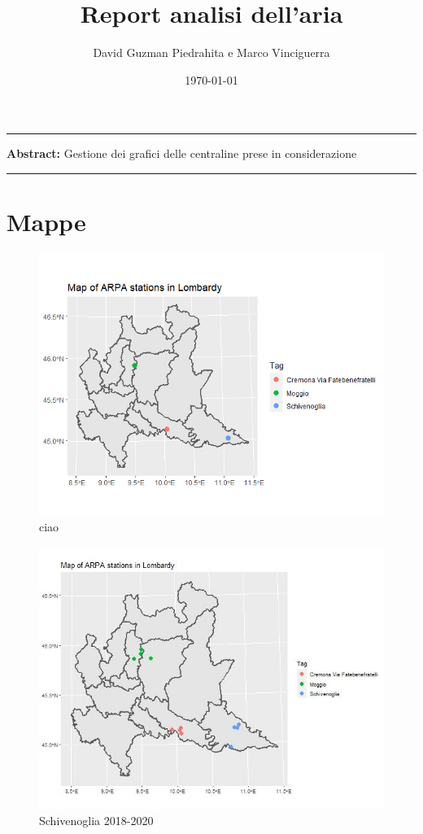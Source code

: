 \documentclass{article}
\title{Report analisi dell'aria}
\author{David Guzman Piedrahita e Marco Vinciguerra}
\date{\today}
\begin{document}
\maketitle

\par\noindent\rule{\textwidth}{0.4pt}
\textbf{Abstract:} Gestione dei grafici delle centraline prese in considerazione
\par\noindent\rule{\textwidth}{0.4pt}
\section{Mappe}
\begin{figure}[H]
  \centering
  \includegraphics[scale = 0.7]{Picture/AQStationsOfInterest.jpeg}
  \caption{ciao}
\end{figure}
\begin{figure}[H]
  \centering
  \includegraphics[scale = 0.45]{Picture/WStationsOfInterestConstrained.jpeg}
  \caption{Schivenoglia 2018-2020}
\end{figure}
\end{document}
